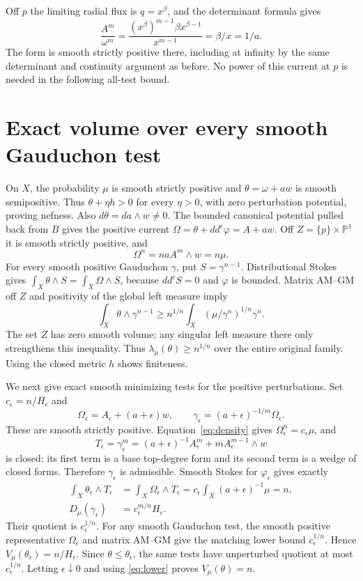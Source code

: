 \documentclass[11pt]{article}
\newcommand{\ddc}{dd^c}
\theoremstyle{remark}\newtheorem{remark}[theorem]{Remark}
\begin{document}
Off $p$ the limiting radial flux is $q=x^\beta$, and the determinant formula
gives
\begin{equation}\label{eq:enddensity}
 \frac{A^m}{\omega^m}=
 \frac{(x^\beta)^{m-1}\beta x^{\beta-1}}{x^{m-1}}=\beta/x=1/a.
\end{equation}
The form is smooth strictly positive there, including at infinity by
the same determinant and continuity argument as before.
No power of this current at $p$ is needed in the following all-test bound.

\section{Exact volume over every smooth Gauduchon test}
On $X$, the probability $\mu$ is smooth strictly positive and
$\theta=\omega+a w$ is smooth semipositive. Thus $\theta+\eta h>0$
for every $\eta>0$, with zero perturbation potential, proving nefness.
Also $d\theta=da\wedge w\ne0$.
The bounded canonical potential pulled back from $B$ gives the positive
current $\Omega=\theta+\ddc\varphi=A+a w$. Off
$Z=\{p\}\times\mathbb P^1$ it is smooth strictly positive, and
\[
 \Omega^n=n a A^m\wedge w=n\mu.
\]
For every smooth positive Gauduchon $\gamma$, put $S=\gamma^{n-1}$.
Distributional Stokes gives $\int_X\theta\wedge S=\int_X\Omega\wedge S$,
because $\ddc S=0$ and $\varphi$ is bounded.
Matrix AM--GM off $Z$ and positivity of the global left measure imply
\begin{equation}\label{eq:lower}
 \int_X\theta\wedge\gamma^{n-1}\geq
 n^{1/n}\int_X(\mu/\gamma^n)^{1/n}\gamma^n.
\end{equation}
The set $Z$ has zero smooth volume; any singular left measure there only
strengthens this inequality. Thus $\lambda_\mu(\theta)\geq n^{1/n}$
over the entire original family. Using the closed metric $h$ shows finiteness.

We next give exact smooth minimizing tests for the positive perturbations.
Set $c_\epsilon=n/H_\epsilon$ and
\[
 \Omega_\epsilon=A_\epsilon+(a+\epsilon)w,
 \qquad\gamma_\epsilon=(a+\epsilon)^{-1/m}\Omega_\epsilon.
\]
These are smooth strictly positive. Equation~\eqref{eq:density} gives
$\Omega_\epsilon^n=c_\epsilon\mu$, and
\[
 T_\epsilon=\gamma_\epsilon^m
 =(a+\epsilon)^{-1}A_\epsilon^m
       +m A_\epsilon^{m-1}\wedge w
\]
is closed: its first term is a base top-degree form and its second term is
a wedge of closed forms. Therefore $\gamma_\epsilon$ is admissible.
Smooth Stokes for $\varphi_\epsilon$ gives exactly
\begin{align*}
 \int_X\theta_\epsilon\wedge T_\epsilon
 &=\int_X\Omega_\epsilon\wedge T_\epsilon
 =c_\epsilon\int_X(a+\epsilon)^{-1}\mu=n,\\
 D_\mu(\gamma_\epsilon)&=c_\epsilon^{m/n}H_\epsilon.
\end{align*}
Their quotient is $c_\epsilon^{1/n}$. For any smooth Gauduchon test,
the smooth positive representative $\Omega_\epsilon$ and matrix AM--GM
give the matching lower bound $c_\epsilon^{1/n}$. Hence
$V_\mu(\theta_\epsilon)=n/H_\epsilon$.
Since $\theta\leq\theta_\epsilon$, the same tests have unperturbed
quotient at most $c_\epsilon^{1/n}$. Letting $\epsilon\downarrow0$
and using \eqref{eq:lower} proves $V_\mu(\theta)=n$.
\end{document}
